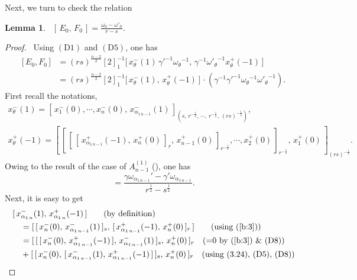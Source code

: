 \documentclass{amsproc}
\newtheorem{lemm}[theo]{Lemma}
\theoremstyle{remark}
\numberwithin{equation}{section}
\begin{document}
Next, we turn to check the relation
\begin{lemm} \
$[\,E_0,\, F_0\,]=\frac{\omega_0-\omega'_0}{r-s}$.
\end{lemm}
\begin{proof}\,
Using $(\textrm{D1})$ and $(\textrm{D5})$, one has
\begin{equation}
\begin{split}
\bigl[\,E_0,
F_0\,\bigr]&=(rs)^{\frac{n-2}{2}}[2]_1^{-1}\bigl[\,x^-_{\theta}(1)\,
\gamma'^{-1}{{\omega}_\theta}^{-1},\,\gamma^{-1}{{\omega}'_\theta}^{-1}
x^+_{\theta}(-1)\,\bigr]\\
&=(rs)^{\frac{n-2}{2}}[2]_1^{-1}\bigl[\,x^-_{\theta}(1),\,x^+_{\theta}(-1)\,\bigr]\,
\cdot(\gamma^{-1}\gamma'^{-1}{{\omega}_\theta}^{-1}{{\omega}'_\theta}^{-1}).
\end{split}
\end{equation}
First recall the notations,
\begin{gather*}
x^-_{\theta}(1)=[\,x_1^-(0),\cdots, x_n^-(0),\,x_{\alpha_{1\,n-1}}^-(1)\,]
_{(s,\,r^{-\frac{1}{2}},\,\cdots,\,r^{-\frac{1}{2}},\,(rs)^{-\frac{1}{2}})},\\
x_{\theta}^+(-1)=[\,[\,[\,[\,x_{\alpha_{1\,n-1}}^+(-1),\,x_n^+(0)\,]_r,\,
x_{n-1}^+(0)\,]_{r^{-\frac{1}{2}}},\cdots, x_2^+(0)\,]_{r^{-\frac{1}{2}}}
,\,x_1^+(0)\,]_{(rs)^{-\frac{1}{2}}}.
\end{gather*}
Owing to the result of the case of $A_{n-1}^{(1)}$ (\cite{HRZ}), one has
\begin{equation}[\,x_{\alpha_{1\,n-1}}^-(1),\,x_{\alpha_{1\,n-1}}^+(-1)\,]=
\frac{\gamma{\omega}_{\alpha_{1\,n-1}}'-\gamma'{\omega}_{\alpha_{1\,n-1}}}
{r^{\frac{1}{2}}-s^{\frac{1}{2}}}.
\end{equation}
Next, it is easy to get
\begin{equation*}
\begin{split}
&[\,x_{\alpha_{1\,n}}^-(1),\,x_{\alpha_{1\,n}}^+(-1)\,]\qquad{\hbox{(by definition)}}\\
&\quad=[\,[\,x_{n}^-(0),\,x_{\alpha_{1\,n-1}}^-(1)\,]_{s}
,\,[\,x_{\alpha_{1\,n-1}}^+(-1),\,x_{n}^+(0)\,]_{r}\,]\qquad{\hbox{(using (\ref{b:3}))}}\\
&\quad=[\,[\,[\,x_{n}^-(0),\,x_{\alpha_{1\,n-1}}^+(-1)\,],\,x_{\alpha_{1\,n-1}}^-(1)\,]_{s}
,\,x_{n}^+(0)\,]_{r}\quad{\hbox{(=0 by (\ref{b:3}) \& (D8))}}\\
&\quad+[\,[\,x_{n}^-(0),\,[\,x_{\alpha_{1\,n-1}}^-(1),\,x_{\alpha_{1\,n-1}}^+(-1)\,]\,]_{s}
,\,x_{n}^+(0)\,]_{r}\quad{\hbox{(using (3.24), (D5), (D8))}}\\

\end{split}
\end{equation*}
\end{proof}
\end{document}
